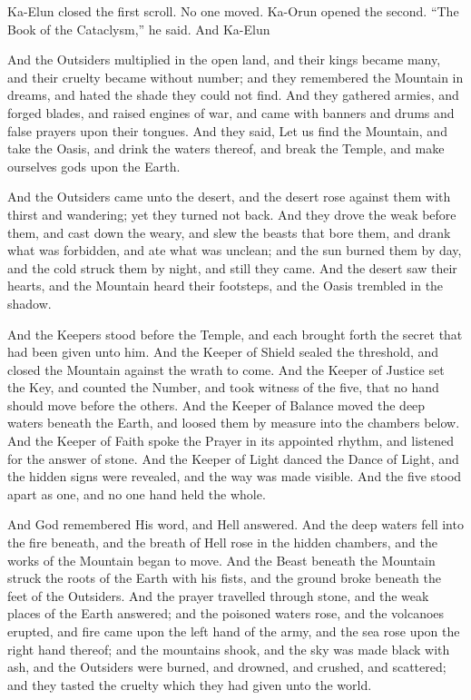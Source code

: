 Ka-Elun closed the first scroll. No one moved. Ka-Orun opened the second. ``The Book of the Cataclysm,'' he said. And Ka-Elun\par
 
\begin{scripture}
And the Outsiders multiplied in the open land, and their kings became many, and their cruelty became without number; and they remembered the Mountain in dreams, and hated the shade they could not find.
And they gathered armies, and forged blades, and raised engines of war, and came with banners and drums and false prayers upon their tongues.
And they said, Let us find the Mountain, and take the Oasis, and drink the waters thereof, and break the Temple, and make ourselves gods upon the Earth.
\end{scripture}
 
\begin{scripture}
And the Outsiders came unto the desert, and the desert rose against them with thirst and wandering; yet they turned not back.
And they drove the weak before them, and cast down the weary, and slew the beasts that bore them, and drank what was forbidden, and ate what was unclean; and the sun burned them by day, and the cold struck them by night, and still they came.
And the desert saw their hearts, and the Mountain heard their footsteps, and the Oasis trembled in the shadow.
\end{scripture}
 
\begin{scripture}
And the Keepers stood before the Temple, and each brought forth the secret that had been given unto him.
And the Keeper of Shield sealed the threshold, and closed the Mountain against the wrath to come.
And the Keeper of Justice set the Key, and counted the Number, and took witness of the five, that no hand should move before the others.
And the Keeper of Balance moved the deep waters beneath the Earth, and loosed them by measure into the chambers below.
And the Keeper of Faith spoke the Prayer in its appointed rhythm, and listened for the answer of stone.
And the Keeper of Light danced the Dance of Light, and the hidden signs were revealed, and the way was made visible.
And the five stood apart as one, and no one hand held the whole.
\end{scripture}
 
\begin{scripture}
And God remembered His word, and Hell answered.
And the deep waters fell into the fire beneath, and the breath of Hell rose in the hidden chambers, and the works of the Mountain began to move.
And the Beast beneath the Mountain struck the roots of the Earth with his fists, and the ground broke beneath the feet of the Outsiders.
And the prayer travelled through stone, and the weak places of the Earth answered; and the poisoned waters rose, and the volcanoes erupted, and fire came upon the left hand of the army, and the sea rose upon the right hand thereof; and the mountains shook, and the sky was made black with ash, and the Outsiders were burned, and drowned, and crushed, and scattered; and they tasted the cruelty which they had given unto the world.
\end{scripture}
 
